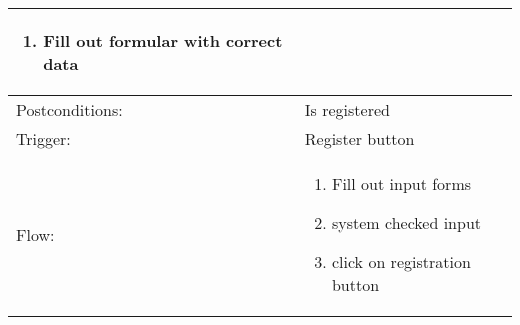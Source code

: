 \begin{longtable}{| p{3.5cm} | p{9cm} |}
\begin{enumerate}
\item Fill out formular with correct data 
\end{enumerate}\\
\hline
Postconditions: & Is registered \\
\hline
Trigger: & Register button \\
\hline
Flow: &\mbox{}\par\vspace{-\baselineskip}
\begin{enumerate}
\item Fill out input forms
\item system checked input
\item click on registration button
\end{enumerate}\\
\hline
\end{longtable}

